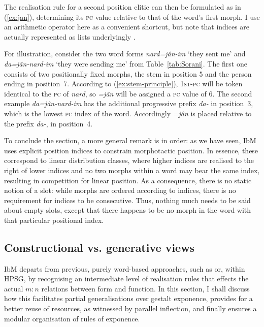 \documentclass[output=paper
	        ,collection
	        ,collectionchapter
 	        ,biblatex
                ,babelshorthands
                ,newtxmath
                ,draftmode
                ,colorlinks, citecolor=brown
]{langscibook}
\newcommand{\mathplus}{{\normalfont +}}
\begin{document}
\begin{exe}
\begin{xlist}
\begin{exe}
\begin{xlist}
The realisation rule for a second position clitic can then be
formulated  as
in (\ref{ex:jan}), determining its \textsc{pc} value relative to that of the
word's first morph. I use an arithmetic operator here as a convenient
shortcut, but note that indices are actually represented as lists 
underlyingly \citep{bonami-crysmann:2013}. 

\begin{exe}
  \ex \label{ex:jan}
  \avmtmp{
    [mud &	\{[per & 3\\
        	num & pl ]\}\\
     mph &	<[ph & <\normalfont jân>\\
        	1st-pc & \1\\
     		pc & \1 \mathplus{} $1$ ]> ]
}
\end{exe}

For illustration, consider the two word forms \textit{nard=jân-im}
`they sent me' and \textit{da=jân-nard-im} `they were sending me' from
Table~\ref{tab:Sorani}. The first one consists of two positionally
fixed morphs, the stem in position 5 and the person ending in
position~7. According to (\ref{ex:stem-principle}), \textsc{1st-pc}
will be token identical to the \textsc{pc} of \textit{nard}, so
\textit{=jân} will be assigned a \textsc{pc} value of 6. The second
example \textit{da=jân-nard-im} has the additional progressive prefix
\textit{da-} in position~3, which is the lowest \textsc{pc} index of the word. Accordingly
\textit{=jân} is placed relative to the prefix \textit{da-}, in position~4.

To conclude the section, a more general remark is in order: as we have
seen, IbM uses explicit position indices to constrain morphotactic
position. In essence, these correspond to linear distribution classes,
where higher indices are realised to the right of lower indices
and no two morphs within a word may bear the same index, resulting in
competition for linear position. As a consequence, there is no static
notion of a slot: while morphs are ordered according to indices, there
is no requirement for indices to be consecutive. Thus, nothing much
needs to be said about empty slots, except that there happens to be no
morph in the word with that particular positional index. 


\subsection{Constructional vs. generative views}
\label{sec:ConstrGen}

IbM departs from previous, purely word-based approaches, such as
\citet{Blevins14} or, within HPSG, \citet[Section~5.2.2]{Koenig99} by recognising an
intermediate level of realisation rules that effects the actual $m:n$
relations between form and function. In this section, I shall discuss
how this facilitates partial generalisations over gestalt exponence,
provides for a better reuse of resources, as witnessed by parallel
inflection, and finally ensures a modular organisation of rules of
exponence.


\end{xlist}
\end{exe}
\end{xlist}
\end{exe}
\end{document}
